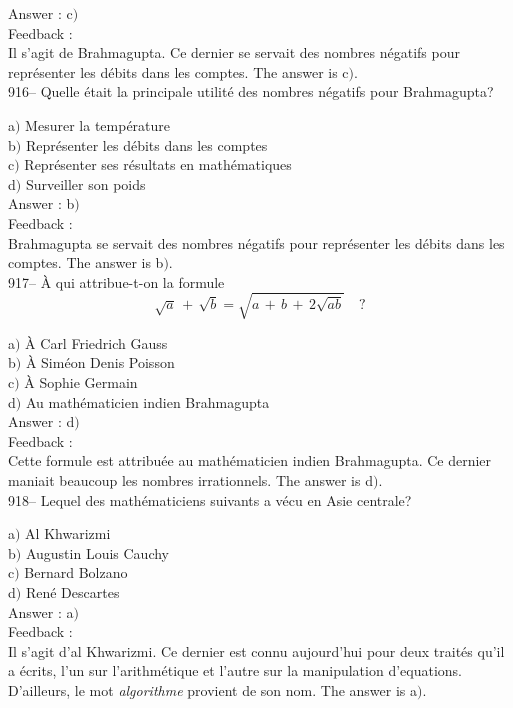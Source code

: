 \documentclass[letterpaper, 12pt]{article}
\begin{document}
Answer : c$)$\\

Feedback : \\
Il s'agit de Brahmagupta. Ce dernier se servait des nombres n\'egatifs pour
repr\'esenter les d\'ebits dans les comptes. The answer is c$)$.\\

916-- Quelle \'etait la principale utilit\'e des nombres n\'egatifs
pour Brahmagupta?

a$)$ Mesurer la temp\'erature \\
b$)$ Repr\'esenter les d\'ebits dans les comptes \\
c$)$ Repr\'esenter ses r\'esultats en math\'ematiques \\
d$)$ Surveiller son poids  \\

Answer : b$)$\\

Feedback : \\
Brahmagupta se servait des nombres n\'egatifs pour repr\'esenter les
d\'ebits dans les comptes. The answer is b$)$.\\

917-- \`A qui attribue-t-on la formule
$$\sqrt a\,+\,\sqrt b=\sqrt{a\,+\,b\,+\,2\sqrt{ab}}\quad?$$

a$)$ \`A Carl Friedrich Gauss \\
b$)$ \`A Sim\'eon Denis Poisson \\
c$)$ \`A Sophie Germain \\
d$)$ Au math\'ematicien indien Brahmagupta  \\

Answer : d$)$\\

Feedback : \\
Cette formule est attribu\'ee au math\'ematicien indien Brahmagupta.
Ce dernier maniait
beaucoup les nombres irrationnels. The answer is d$)$.\\

918-- Lequel des math\'ematiciens suivants a v\'ecu en Asie
centrale?

a$)$ Al Khwarizmi \\
b$)$ Augustin Louis Cauchy \\
c$)$ Bernard Bolzano \\
d$)$ Ren\'e Descartes  \\

Answer : a$)$\\

Feedback : \\
Il s'agit d'al Khwarizmi. Ce dernier est connu aujourd'hui pour deux
trait\'es qu'il a \'ecrits, l'un sur l'arithm\'etique et l'autre sur
la manipulation d'equations. D'ailleurs, le mot
{\sl algorithme} provient de son nom. The answer is a$)$.\\
\end{document}
